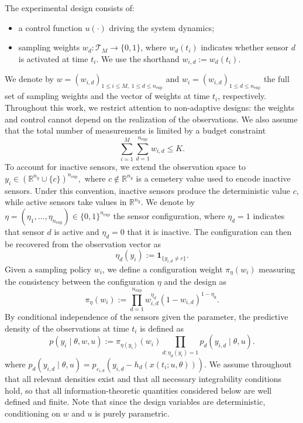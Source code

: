 \documentclass[a4paper,11pt]{article}
\begin{document}
The experimental design consists of:
\begin{itemize}
    \item a control function $u(\cdot)$ driving the system dynamics;
    \item sampling weights $w_d:\mathcal{T}_M\to\{0,1\}$, where $w_d(t_i)$ indicates whether sensor $d$ is activated at time $t_i$. We use the shorthand $w_{i,d} := w_d(t_i)$.
\end{itemize}
We denote by
\(
w = (w_{i,d})_{1\le i \le M,\; 1\le d \le n_{\mathrm{exp}}}
\) and \(
w_i = (w_{i,d})_{1\le d \le n_{\mathrm{exp}}}
\)
the full set of sampling weights and the vector of weights at time $t_i$, respectively. Throughout this work, we restrict attention to non-adaptive designs: the weights and control cannot depend on the realization of the observations. We also assume that the total number of measurements is limited by a budget constraint
\[
    \sum_{i=1}^M \sum_{d=1}^{n_{\text{exp}}} w_{i,d} \le K.
\]
To account for inactive sensors, we extend the observation space to 
\(
y_i \in (\mathbb{R}^{n_y} \cup \{c\})^{n_{\mathrm{exp}}},
\)
where $c \notin \mathbb{R}^{n_y}$ is a cemetery value used to encode inactive
sensors. 
Under this convention, inactive sensors produce the deterministic value $c$,
while active sensors take values in $\mathbb{R}^{n_y}$. We denote by
\(
\eta = (\eta_1,\dots,\eta_{n_{\mathrm{exp}}}) \in \{0,1\}^{n_{\mathrm{exp}}}
\)
the sensor configuration, where $\eta_d = 1$ indicates that sensor $d$
is active and $\eta_d = 0$ that it is inactive. The configuration can
then be recovered from the observation vector as
\begin{equation} \label{eq:config_y}
\eta_d(y_i) := \mathbf{1}_{\{y_{i,d} \neq c\}} .
\end{equation}
Given a sampling policy $w_i$, we define a configuration weight $\pi_\eta(w_i)$ measuring the consistency between the configuration $\eta$ and the design as
\begin{equation} \label{eq:configuration_weight}
\pi_\eta(w_i)
:=
\prod_{d=1}^{n_{\mathrm{exp}}}
w_{i,d}^{\eta_d}
(1-w_{i,d})^{1-\eta_d}.
\end{equation}
By conditional independence of the sensors given the parameter,
the predictive density of the observations at time $t_i$ is defined as
\begin{equation} \label{eq:likelihood_def}
p(y_i \mid \theta, w, u)
:=
\pi_{\eta(y_i)}(w_i)
\prod_{d:\eta_d(y_i)=1}
p_d(y_{i,d} \mid \theta, u).
\end{equation}
where
\(
p_d(y_{i,d}\mid\theta,u)
=
p_{\varepsilon_{i,d}}
\!\left(y_{i,d}-h_d(x(t_i;u,\theta))\right).
\)
We assume throughout that all relevant densities exist and that all necessary
integrability conditions hold, so that all information-theoretic quantities
considered below are well defined and finite. Note that since the design variables are deterministic, conditioning on $w$ and $u$ is purely parametric.
 
\end{document}
